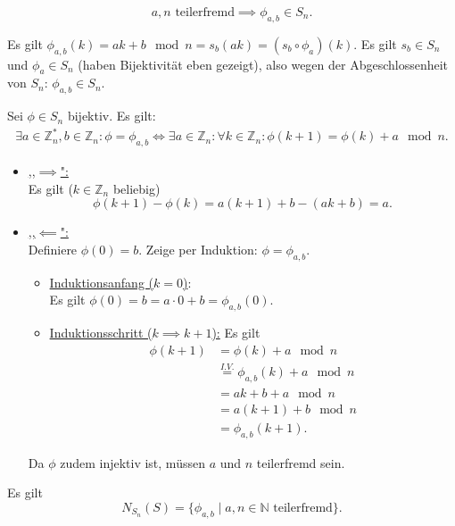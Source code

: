 \documentclass[a4paper]{article}
\newcommand{\N}{\mathbb{N}}
\newcommand{\Z}{\mathbb{Z}}
\begin{document}
    \begin{lemma}\label{phi_bij}
        \[
            a, n \text{ teilerfremd} \implies \phi_{a, b} \in S_n
        .\] 
    \end{lemma}
    \begin{beweis}
       Es gilt  $\phi_{a, b}(k) = ak + b \mod n = s_b(ak) = (s_b \circ \phi_a)(k) $. Es gilt $s_b \in S_n$ und $\phi_a \in S_n$ (haben Bijektivität eben gezeigt), also wegen der Abgeschlossenheit von $S_n$:  $\phi_{a, b} \in S_n$. \\ 
    \end{beweis}

    \begin{lemma} \label{phiab-equiv}
        Sei $\phi \in S_n$ bijektiv. Es gilt:
        \begin{align*}
            \exists a \in \Z_n^{*}, b \in \Z_n : \phi = \phi_{a, b}
            \iff \exists a \in \Z_n: \forall k \in \Z_n: \phi(k+1) = \phi(k)+a \mod n
        .\end{align*}
    \end{lemma}

    \begin{beweis}
        \begin{itemize}
            \item \underline{,,$\implies$":} \\
                Es gilt ($k \in \Z_n$ beliebig)
                \[
                    \phi(k+1) - \phi(k) = a(k+1) + b - (ak + b) = a
                .\] 
            \item \underline{,,$\impliedby$":} \\
            Definiere $\phi(0) = b.$ Zeige per Induktion: $\phi = \phi_{a, b}$.
        \begin{itemize}
            \item \underline{Induktionsanfang ($k = 0$)}: \\
                Es gilt $\phi(0) = b = a \cdot 0 + b = \phi_{a, b}(0)$.
            \item \underline{Induktionsschritt ($k \implies k+1$):}
                Es gilt
                \begin{align*}
                    \phi(k+1) &= \phi(k) +  a \mod n \\
                              &\overset{I.V.}{=} \phi_{a,b}(k) + a \mod n \\
                              &= ak + b + a \mod n \\
                              &= a(k+1) + b \mod n \\
                              &= \phi_{a, b}(k+1)
                .\end{align*}
        \end{itemize}
        Da $\phi$ zudem injektiv ist, müssen $a$ und $n$ teilerfremd sein.
        \end{itemize}
    \end{beweis}
    \begin{satz}
        Es gilt
        \[
            N_{S_n}(S) = \{\phi_{a, b}  \mid a, n \in \N \text{ teilerfremd}\} 
        .\] 
    \end{satz}
\end{document}

